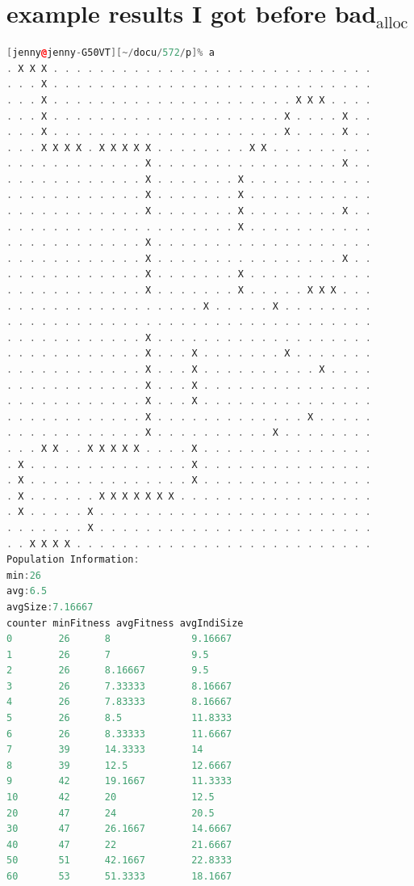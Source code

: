 \documentclass[10pt,b5paper]{article}
\begin{document}
\section{example results I got before bad$_{\text{alloc}}$}
\label{sec-4}

\begin{lstlisting}[language=c++]
[jenny@jenny-G50VT][~/docu/572/p]% a
. X X X . . . . . . . . . . . . . . . . . . . . . . . . . . . . 
. . . X . . . . . . . . . . . . . . . . . . . . . . . . . . . . 
. . . X . . . . . . . . . . . . . . . . . . . . . X X X . . . . 
. . . X . . . . . . . . . . . . . . . . . . . . X . . . . X . . 
. . . X . . . . . . . . . . . . . . . . . . . . X . . . . X . . 
. . . X X X X . X X X X X . . . . . . . . X X . . . . . . . . . 
. . . . . . . . . . . . X . . . . . . . . . . . . . . . . X . . 
. . . . . . . . . . . . X . . . . . . . X . . . . . . . . . . . 
. . . . . . . . . . . . X . . . . . . . X . . . . . . . . . . . 
. . . . . . . . . . . . X . . . . . . . X . . . . . . . . X . . 
. . . . . . . . . . . . . . . . . . . . X . . . . . . . . . . . 
. . . . . . . . . . . . X . . . . . . . . . . . . . . . . . . . 
. . . . . . . . . . . . X . . . . . . . . . . . . . . . . X . . 
. . . . . . . . . . . . X . . . . . . . X . . . . . . . . . . . 
. . . . . . . . . . . . X . . . . . . . X . . . . . X X X . . . 
. . . . . . . . . . . . . . . . . X . . . . . X . . . . . . . . 
. . . . . . . . . . . . . . . . . . . . . . . . . . . . . . . . 
. . . . . . . . . . . . X . . . . . . . . . . . . . . . . . . . 
. . . . . . . . . . . . X . . . X . . . . . . . X . . . . . . . 
. . . . . . . . . . . . X . . . X . . . . . . . . . . X . . . . 
. . . . . . . . . . . . X . . . X . . . . . . . . . . . . . . . 
. . . . . . . . . . . . X . . . X . . . . . . . . . . . . . . . 
. . . . . . . . . . . . X . . . . . . . . . . . . . X . . . . . 
. . . . . . . . . . . . X . . . . . . . . . . X . . . . . . . . 
. . . X X . . X X X X X . . . . X . . . . . . . . . . . . . . . 
. X . . . . . . . . . . . . . . X . . . . . . . . . . . . . . . 
. X . . . . . . . . . . . . . . X . . . . . . . . . . . . . . . 
. X . . . . . . X X X X X X X . . . . . . . . . . . . . . . . . 
. X . . . . . X . . . . . . . . . . . . . . . . . . . . . . . . 
. . . . . . . X . . . . . . . . . . . . . . . . . . . . . . . . 
. . X X X X . . . . . . . . . . . . . . . . . . . . . . . . . . 
Population Information: 
min:26
avg:6.5
avgSize:7.16667
counter minFitness avgFitness avgIndiSize
0        26      8              9.16667
1        26      7              9.5
2        26      8.16667        9.5
3        26      7.33333        8.16667
4        26      7.83333        8.16667
5        26      8.5            11.8333
6        26      8.33333        11.6667
7        39      14.3333        14
8        39      12.5           12.6667
9        42      19.1667        11.3333
10       42      20             12.5
20       47      24             20.5
30       47      26.1667        14.6667
40       47      22             21.6667
50       51      42.1667        22.8333
60       53      51.3333        18.1667
\end{lstlisting}
\end{document}
